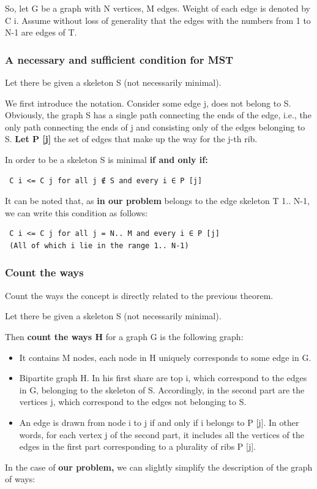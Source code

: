 So, let G be a graph with N vertices, M edges. Weight of each edge is denoted by C i. Assume without loss of generality that the edges with the numbers from 1 to N-1 are edges of T.

\subsubsection{ A necessary and sufficient condition for MST }
Let there be given a skeleton S (not necessarily minimal).

We first introduce the notation. Consider some edge j, does not belong to S. Obviously, the graph S has a single path connecting the ends of the edge, i.e., the only path connecting the ends of j and consisting only of the edges belonging to S. \textbf{Let P [j]} the set of edges that make up the way for the j-th rib.

In order to be a skeleton S is minimal \textbf{if and only if:}

\begin{verbatim}
 C i <= C j for all j ∉ S and every i ∈ P [j] 
\end{verbatim}
It can be noted that, as \textbf{in our problem} belongs to the edge skeleton T 1.. N-1, we can write this condition as follows:

\begin{verbatim}
 C i <= C j for all j = N.. M and every i ∈ P [j]
 (All of which i lie in the range 1.. N-1) 
\end{verbatim} \subsubsection{ Count the ways }
Count the ways the concept is directly related to the previous theorem.

Let there be given a skeleton S (not necessarily minimal).

Then \textbf{count the ways H} for a graph G is the following graph:

\begin{itemize} \item It contains M nodes, each node in H uniquely corresponds to some edge in G. \item Bipartite graph H. In his first share are top i, which correspond to the edges in G, belonging to the skeleton of S. Accordingly, in the second part are the vertices j, which correspond to the edges not belonging to S. \item An edge is drawn from node i to j if and only if i belongs to P [j]. 
In other words, for each vertex j of the second part, it includes all the vertices of the edges in the first part corresponding to a plurality of ribs P [j]. \end{itemize}
In the case of \textbf{our problem,} we can slightly simplify the description of the graph of ways:

